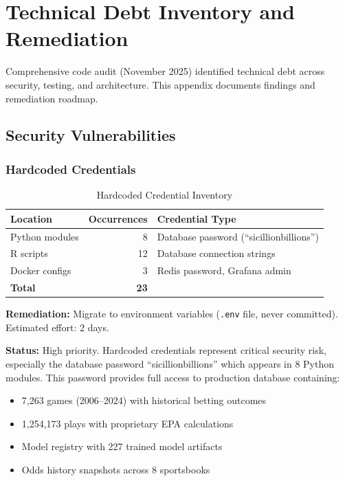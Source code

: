 \chapter{Technical Debt Inventory and Remediation}
\label{app:technical_debt}

Comprehensive code audit (November 2025) identified technical debt across security, testing, and architecture. This appendix documents findings and remediation roadmap.

\section{Security Vulnerabilities}

\subsection{Hardcoded Credentials}

\begin{table}[htbp]
\centering
\caption{Hardcoded Credential Inventory}
\label{tab:hardcoded_credentials}
\begin{tabular}{@{}lrp{5cm}@{}}
\toprule
\textbf{Location} & \textbf{Occurrences} & \textbf{Credential Type} \\
\midrule
Python modules & 8 & Database password (``sicillionbillions'') \\
R scripts & 12 & Database connection strings \\
Docker configs & 3 & Redis password, Grafana admin \\
\midrule
\textbf{Total} & \textbf{23} & \\
\bottomrule
\end{tabular}
\end{table}

\textbf{Remediation:} Migrate to environment variables (\texttt{.env} file, never committed). Estimated effort: 2 days.

\textbf{Status:} High priority. Hardcoded credentials represent critical security risk, especially the database password ``sicillionbillions'' which appears in 8 Python modules. This password provides full access to production database containing:
\begin{itemize}
    \item 7,263 games (2006--2024) with historical betting outcomes
    \item 1,254,173 plays with proprietary EPA calculations
    \item Model registry with 227 trained model artifacts
    \item Odds history snapshots across 8 sportsbooks
\end{itemize}

